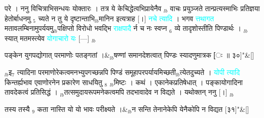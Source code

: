 \documentclass[article,12pt,a4paper]{memoir}%
\newcommand{\quotelemma}[1]{\textcolor{cyan}{#1}}
\newcounter{parCount}
\begin{document}
	  
	  \pstart \leavevmode%
	परे । ननु विचित्राभिसन्धयः योक्तारः । तत्र ये केचिद्धेत्वभिप्रायेनैव {\tiny $_{lb}$} वाचः प्रयुञ्जते तान्प्रत्यस्माभिः प्रतिज्ञया हेतोर्बाधनमु {\tiny $_{5}$} च्यते न तु ये दृष्टान्ताभि{\tiny $_{lb}$}मानिन इत्यत्राह [।] \quotelemma{नचे \cite[10b9]{vn-msN} त्यादि} । भगव \quotelemma{त्तथागत} मतावलम्बिनामुपर्ययमु{\tiny $_{lb}$}पक्षिप्तो विरोधो भवद्भि \quotelemma{राक्षपादै} र्न च नः स्वप्न {\tiny $_{6}$} व्ये तादृशोस्तीति पिण्डार्थः । {\tiny $_{lb}$}स्यात् मतमस्त्येव \quotelemma{योगाचारो यः} [—]
	{}
	\pend%
      {\tiny $_{lb}$}

	  
	  \pstart \leavevmode%
	\leavevmode{} 
	    \pend%
	  
	    
	    \stanza[\smallbreak]
	  पङ्केन युगपद्योगात् परमाणोः पतङ्गतां ।&{\tiny $_{lb}$}षण्णां समानदेशत्वात् पिण्डः स्यादणुमात्रक [ः ॥ ३०]{\normalfontlatin\large\qquad{}"}\&[\smallbreak]
	  
	  
	  
	    \pstart  \leavevmode%
	    \hphantom{.}
	   {\tiny $_{lb}$}इ{\tiny $_{7}$} त्यादिना परमाणोरेकत्वमनभ्युपगच्छन्नपि पिण्डं समूहापरपर्यायमिच्छती{\tiny $_{lb}$}त्येतदुच्यते । \quotelemma{योपी \cite[11a1]{vn-msN} त्यादि} किन्तर्ह्यभाव एवाणोरनेन प्रकारेण साधयितु {\tiny $_{8}$} {\tiny $_{lb}$}मिष्टः । कथं । एकानेकप्रतिषेधात् । पङ्कायोगादिना तावदेकत्वं प्रतिसिद्धं । {\tiny $_{lb}$}तत्समुदायरूपमनेकत्वमपि तदभावादेव न विद्यते । यथोक्तन् ननु  [।] {\tiny $_{lb}$} 
	    \pend%
	  
	    
	    \stanza[\smallbreak]
	  तस्य तस्यै {\tiny $_{9}$}\leavevmode{} कता नास्ति यो यो भावः परीक्ष्यते ।&{\tiny $_{lb}$}न सन्ति तेनानेकेपि येनैकोपि न विद्यत [३१]{\normalfontlatin\large\qquad{}"}\&[\smallbreak]
	  
	  
	  
\end{document}
